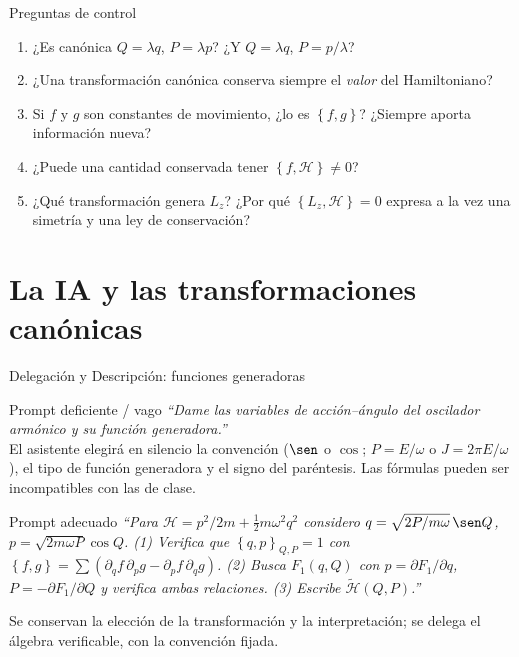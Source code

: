 \documentclass[spanish]{beamer}
\newcommand{\Ham}{\mathcal{H}}               %
\newcommand{\tH}{\tilde{\mathcal{H}}}        %
\newcommand{\pb}[2]{\left\{#1,#2\right\}}    %
\begin{document}
\begin{frame}{Preguntas de control}
\begin{enumerate}[<+->]
  \item ¿Es canónica $Q=\lambda q$, $P=\lambda p$? ¿Y $Q=\lambda q$, $P=p/\lambda$?
  \item ¿Una transformación canónica conserva siempre el \emph{valor} del Hamiltoniano?
  \item Si $f$ y $g$ son constantes de movimiento, ¿lo es $\pb{f}{g}$? ¿Siempre aporta
        información nueva?
  \item ¿Puede una cantidad conservada tener $\pb{f}{\Ham}\neq0$?
  \item ¿Qué transformación genera $L_z$? ¿Por qué $\pb{L_z}{\Ham}=0$ expresa a la vez
        una simetría y una ley de conservación?
\end{enumerate}
\end{frame}

\section{La IA y las transformaciones canónicas}

\begin{frame}{\alert{Delegación} y \alert{Descripción}: funciones generadoras}
\begin{alertblock}{Prompt deficiente / vago}
\textit{“Dame las variables de acción--ángulo del oscilador armónico y su función
generadora.”}\\
El asistente elegirá en silencio la convención ($\sen$ o $\cos$; $P=E/\omega$ o
$J=2\pi E/\omega$), el tipo de función generadora y el signo del paréntesis.
Las fórmulas pueden ser incompatibles con las de clase.
\end{alertblock}
\pause
\begin{exampleblock}{Prompt adecuado}
\textit{“Para $\Ham=p^2/2m+\tfrac12 m\omega^2q^2$ considero
$q=\sqrt{2P/m\omega}\,\sen Q$, $p=\sqrt{2m\omega P}\cos Q$.
(1) Verifica que $\pb{q}{p}_{Q,P}=1$ con
$\pb{f}{g}=\sum(\partial_q f\,\partial_p g-\partial_p f\,\partial_q g)$.
(2) Busca $F_1(q,Q)$ con $p=\partial F_1/\partial q$, $P=-\partial F_1/\partial Q$
y verifica ambas relaciones. (3) Escribe $\tH(Q,P)$.”}
\end{exampleblock}
\pause
Se conservan la elección de la transformación y la interpretación; se delega el
álgebra verificable, con la convención fijada.
\end{frame}
\end{document}
